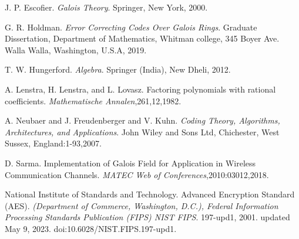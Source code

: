 
\begin{thebibliography}{9}

J. P. Escofier. \emph{Galois Theory}. Springer, New York, 2000.

G. R. Holdman. \emph{Error Correcting Codes  Over Galois Rings}. Graduate Dissertation, Department of Mathematics, Whitman college, 345 Boyer Ave.
Walla Walla, Washington, U.S.A, 2019.

T. W. Hungerford. \emph{Algebra}. Springer (India), New Dheli, 2012.

A. Lenstra, H. Lenstra, and L. Lovasz. Factoring polynomials with rational coefficients. \emph{Mathematische Annalen},261,12,1982.

A. Neubaer and J. Freudenberger and V. Kuhn. \emph{Coding Theory, Algorithms, Architectures, and Applications}. John Wiley and Sons Ltd, Chichester, West Sussex, England:1-93,2007.

D. Sarma. Implementation of Galois Field for Application in Wireless Communication Channels. \emph{MATEC Web of Conferences},2010:03012,2018.

National Institute of Standards and Technology. Advanced Encryption
Standard (AES). \emph{(Department of Commerce, Washington, D.C.), Federal Information Processing Standards Publication (FIPS) NIST FIPS}. 197-upd1, 2001. updated May 9, 2023. doi:10.6028/NIST.FIPS.197-upd1.
\end{thebibliography}
\clearpage